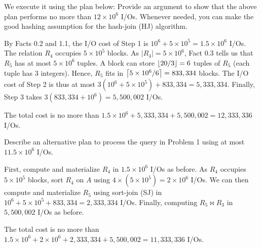 We execute it using the plan below:
\noindent Provide an argument to show that the above plan performs no more than $12 \times 10^6$ I/Os. Whenever needed, you can make the good hashing assumption for the hash-join (HJ) algorithm.

\begin{sol}
 By Facts 0.2 and 1.1, the I/O cost of Step 1 is $10^6 + 5 \times 10^5 = 1.5 \times 10^6$ I/Os. The relation $R_4$ occupies $5 \times 10^5$ blocks. As $|R_4| = 5 \times 10^6$, Fact 0.3 tells us that $R_5$ has at most $5 \times 10^6$ tuples. A block can store $\left \lfloor 20/3 \right \rfloor = 6$ tuples of $R_5$ (each tuple has 3 integers). Hence, $R_5$ fits in $\left \lceil 5 \times 10^6 / 6 \right \rceil = 833,334$ blocks. The I/O cost of Step 2 is thus at most $3 (10^6 + 5 \times 10^5) + 833,334 = 5,333,334$. Finally, Step 3 takes $3 (833,334 + 10^6) = 5,500,002$ I/Os.

\vgap

The total cost is no more than $1.5 \times 10^6 + 5,333,334 + 5,500,002 = 12,333,336$ I/Os.

\end{sol}


 Describe an alternative plan to process the query in Problem 1 using at most $11.5 \times 10^6$ I/Os.

\begin{sol}
 First, compute and materialize $R_4$ in $1.5 \times 10^6$ I/Os as before. As $R_4$ occupies $5 \times 10^5$ blocks, sort $R_4$ on $A$ using $4 \times (5 \times 10^5) = 2 \times 10^6$ I/Os. We can then compute and materialize $R_5$ using sort-join (SJ) in $10^6 + 5 \times 10^5 + 833,334 = 2,333,334$ I/Os. Finally, computing $R_5 \bowtie R_3$ in $5,500,002$ I/Os as before.

\vgap

The total cost is no more than $1.5 \times 10^6 + 2 \times 10^6 + 2,333,334 + 5,500,002 = 11,333,336$ I/Os.

\end{sol}



